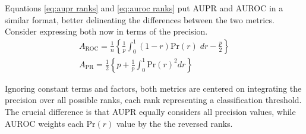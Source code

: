 Equations \ref{eq:aupr ranks} and \ref{eq:auroc ranks} put AUPR and AUROC in a similar format, better delineating the differences between the two metrics. Consider expressing both now in terms of the precision.
%
\begin{gather}
    A_\text{ROC} = \frac{1}{n} \left\{
        \frac{1}{p}\int_{0}^{1} (1 - r)\text{Pr}(r) \;dr - \frac{p}{2}
    \right\}\\
    A_\text{PR} = \frac{1}{2} \left\{
        p + \frac{1}{p}\int_0^1 \text{Pr}(r)^2 dr
    \right\}
\end{gather}
%
%

%
%
%
%
Ignoring constant terms and factors, both metrics are centered on integrating the precision over all possible ranks, each rank representing a classification threshold. The crucial difference is that AUPR equally considers all precision values, while AUROC weights each $\text{Pr}(r)$ value by the the reversed ranks.

